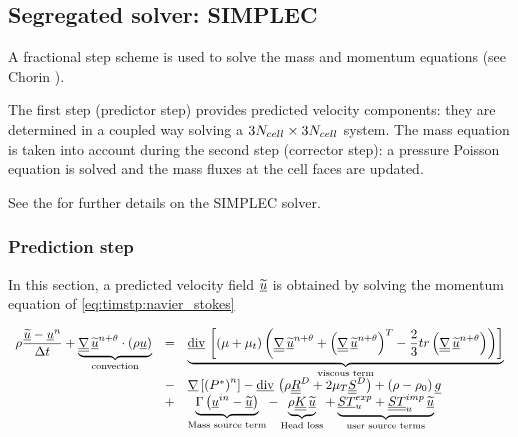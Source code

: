 \subsection{Segregated solver: SIMPLEC}
A fractional step scheme is used to solve the mass and momentum equations
(see Chorin \cite{Chorin:1968}).

The first step (predictor step) provides predicted velocity
components: they are determined in a coupled way solving a $3 {N_{cell}} \times 3 {N_{cell}} $ system.
The mass equation is taken into account during the second step
(corrector step): a pressure Poisson equation is solved and the mass fluxes
at the cell faces are updated.

See the  for further details
on the SIMPLEC solver.

\subsubsection{Prediction step}
In this section, a predicted velocity field $ \widetilde{\underline{u}} $ is obtained by solving
the momentum equation of \eqref{eq:timstp:navier_stokes}

\begin{equation}\label{eq:timstp:prediction}
\begin{array}{rcl}
\displaystyle \rho \dfrac{ \vect{\widetilde{u}} - \vect{u}^{n} } { \Delta t}
+
\underbrace {
\gradt \,  \vect{\widetilde{u}}^{n+\theta} \cdot \left( \rho\vect{u} \right)
}_{
\text{convection}
}%
&= & \underbrace{
\divv \left[ \left(\mu+\mu_t\right) \left( \gradt \, \vect{\widetilde{u}}^{n+\theta}
          + \transpose{\left(\gradt \, \vect{\widetilde{u}}^{n+\theta}\right)}
          - \frac{2}{3} \trace \left( \gradt \, \vect{\widetilde{u}}^{n+\theta}  \right)\right)\right]
}_{
\text{viscous term}
}%
\\
 &-& \grad \left[ \left(P^*\right)^n \right]
 - \divv \left( \rho \deviator{\tens{R}}  + 2 \mu_T \deviator{\tens{S}}\right)
 + \left( \rho -\rho_0 \right) \vect{g} \\
&\displaystyle +&
\underbrace{
\Gamma \left( \vect{u}^{in}-\vect{\widetilde{u}} \right)
}_{
\text{Mass source term}
}%
-
\underbrace{
\rho \tens{K} \, \vect{\widetilde{u}}
}_{
\text{Head loss}
}%
 +
\underbrace{
\vect{ST}_{u}^{exp}+ \tens{ST}_{u}^{imp}\, \vect{\widetilde{u}}
}_{
\text{user source terms}
}%
\end{array}
\end{equation}

